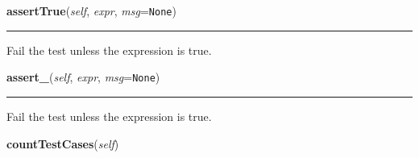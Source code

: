     \label{unittest:TestCase:failUnless}

    \vspace{0.5ex}

    \begin{boxedminipage}{\textwidth}

    \raggedright \textbf{assertTrue}(\textit{self}, \textit{expr}, \textit{msg}=\texttt{None})

    \vspace{-1.5ex}

    \rule{\textwidth}{0.5\fboxrule}
    Fail the test unless the expression is true.

    \vspace{1ex}

    \end{boxedminipage}

    \label{unittest:TestCase:failUnless}

    \vspace{0.5ex}

    \begin{boxedminipage}{\textwidth}

    \raggedright \textbf{assert\_}(\textit{self}, \textit{expr}, \textit{msg}=\texttt{None})

    \vspace{-1.5ex}

    \rule{\textwidth}{0.5\fboxrule}
    Fail the test unless the expression is true.

    \vspace{1ex}

    \end{boxedminipage}

    \label{unittest:TestCase:countTestCases}

    \vspace{0.5ex}

    \begin{boxedminipage}{\textwidth}

    \raggedright \textbf{countTestCases}(\textit{self})

    \end{boxedminipage}

    \label{unittest:TestCase:debug}

    \vspace{0.5ex}

